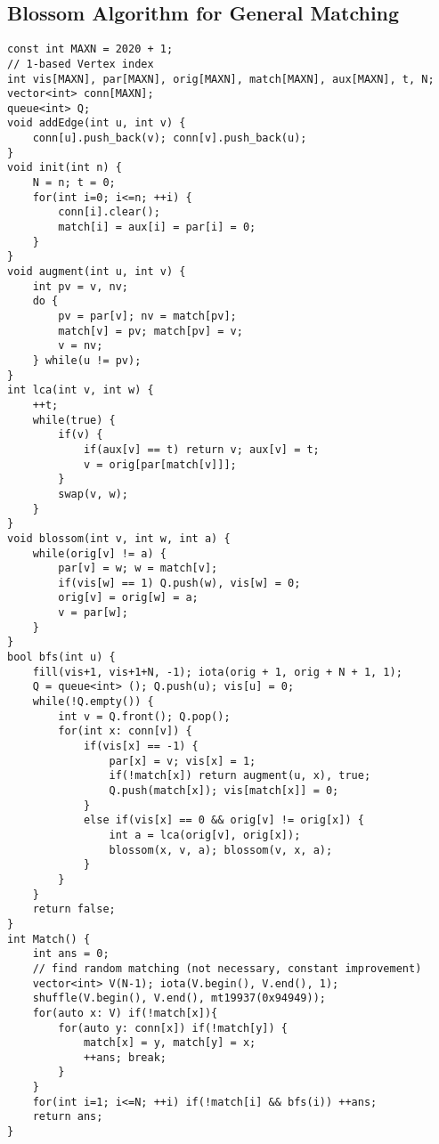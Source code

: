 \documentclass[landscape, 8pt, a4paper, oneside, twocolumn]{extarticle}
\begin{document}
\subsection{Blossom Algorithm for General Matching}
\begin{verbatim}
const int MAXN = 2020 + 1;
// 1-based Vertex index
int vis[MAXN], par[MAXN], orig[MAXN], match[MAXN], aux[MAXN], t, N;
vector<int> conn[MAXN];
queue<int> Q;
void addEdge(int u, int v) {
	conn[u].push_back(v); conn[v].push_back(u);
}
void init(int n) {
	N = n; t = 0;
	for(int i=0; i<=n; ++i) {
		conn[i].clear();
		match[i] = aux[i] = par[i] = 0;
	}
}
void augment(int u, int v) {
	int pv = v, nv;
	do {
		pv = par[v]; nv = match[pv];
		match[v] = pv; match[pv] = v;
		v = nv;
	} while(u != pv);
}
int lca(int v, int w) {
	++t;
	while(true) {
		if(v) {
			if(aux[v] == t) return v; aux[v] = t;
			v = orig[par[match[v]]];
		}
		swap(v, w);
	}
}
void blossom(int v, int w, int a) {
	while(orig[v] != a) {
		par[v] = w; w = match[v];
		if(vis[w] == 1) Q.push(w), vis[w] = 0;
		orig[v] = orig[w] = a;
		v = par[w];
	}
}
bool bfs(int u) {
	fill(vis+1, vis+1+N, -1); iota(orig + 1, orig + N + 1, 1);
	Q = queue<int> (); Q.push(u); vis[u] = 0;
	while(!Q.empty()) {
		int v = Q.front(); Q.pop();
		for(int x: conn[v]) {
			if(vis[x] == -1) {
				par[x] = v; vis[x] = 1;
				if(!match[x]) return augment(u, x), true;
				Q.push(match[x]); vis[match[x]] = 0;
			}
			else if(vis[x] == 0 && orig[v] != orig[x]) {
				int a = lca(orig[v], orig[x]);
				blossom(x, v, a); blossom(v, x, a);
			}
		}
	}
	return false;
}
int Match() {
	int ans = 0;
	// find random matching (not necessary, constant improvement)
	vector<int> V(N-1); iota(V.begin(), V.end(), 1);
	shuffle(V.begin(), V.end(), mt19937(0x94949));
	for(auto x: V) if(!match[x]){
		for(auto y: conn[x]) if(!match[y]) {
			match[x] = y, match[y] = x;
			++ans; break;
		}
	}
	for(int i=1; i<=N; ++i) if(!match[i] && bfs(i)) ++ans;
	return ans;
}
\end{verbatim}
\end{document}
